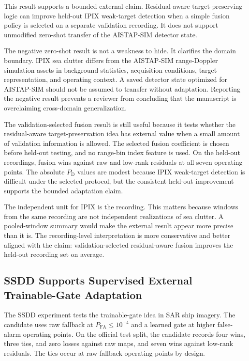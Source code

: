 \documentclass[journal]{IEEEtran}
\begin{document}
This result supports a bounded external claim. Residual-aware target-preserving logic can improve held-out IPIX weak-target detection when a simple fusion policy is selected on a separate validation recording. It does not support unmodified zero-shot transfer of the AISTAP-SIM detector state.

The negative zero-shot result is not a weakness to hide. It clarifies the domain boundary. IPIX sea clutter differs from the AISTAP-SIM range-Doppler simulation assets in background statistics, acquisition conditions, target representation, and operating context. A saved detector state optimized for AISTAP-SIM should not be assumed to transfer without adaptation. Reporting the negative result prevents a reviewer from concluding that the manuscript is overclaiming cross-domain generalization.

The validation-selected fusion result is still useful because it tests whether the residual-aware target-preservation idea has external value when a small amount of validation information is allowed. The selected fusion coefficient is chosen before held-out testing, and no range-bin index feature is used. On the held-out recordings, fusion wins against raw and low-rank residuals at all seven operating points. The absolute $P_{\mathrm{D}}$ values are modest because IPIX weak-target detection is difficult under the selected protocol, but the consistent held-out improvement supports the bounded adaptation claim.

The independent unit for IPIX is the recording. This matters because windows from the same recording are not independent realizations of sea clutter. A pooled-window summary would make the external result appear more precise than it is. The recording-level interpretation is more conservative and better aligned with the claim: validation-selected residual-aware fusion improves the held-out recording set on average.

\subsection{SSDD Supports Supervised External Trainable-Gate Adaptation}

The SSDD experiment tests the trainable-gate idea in SAR ship imagery. The candidate uses raw fallback at $P_{\mathrm{FA}} \leq 10^{-4}$ and a learned gate at higher false-alarm operating points. On the official test split, the candidate records four wins, three ties, and zero losses against raw maps, and seven wins against low-rank residuals. The ties occur at raw-fallback operating points by design.
\end{document}
